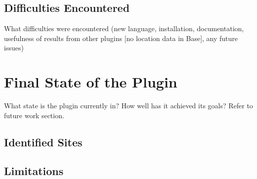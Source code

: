 \subsection{Difficulties Encountered}

What difficulties were encountered (new language, installation, documentation, usefulness of results from other plugins [no location data in Base], any future issues)

\section{Final State of the Plugin}

What state is the plugin currently in? How well has it achieved its goals? Refer to future work section.

\subsection{Identified Sites}

\subsection{Limitations}
